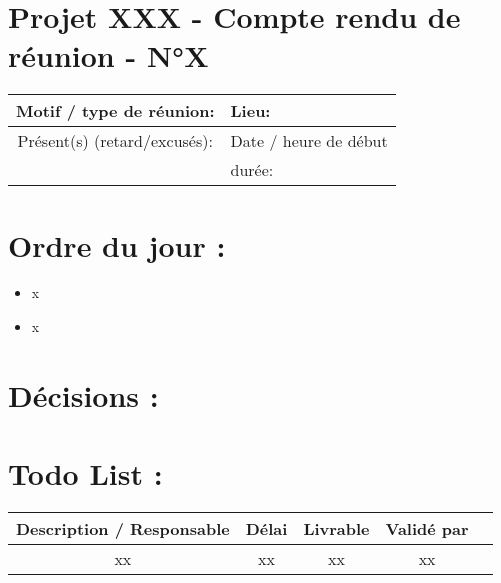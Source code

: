 \documentclass{article}
\begin{document}
\section*{Projet XXX - Compte rendu de réunion - N°X}

\begin{tabular}{|c|p{6cm}|}
    \hline
    Motif / type de réunion: & Lieu: \\
    \hline
    Présent(s) (retard/excusés): & Date / heure de début \\
    & durée: \\
    \hline
\end{tabular}


\section*{Ordre du jour :}
\begin{itemize}
    \item x
    \item x
\end{itemize}

\section*{Décisions :}

\section*{Todo List :}
\begin{tabular}{|c|c|c|c|c}
    \hline
    Description / Responsable & Délai & Livrable & Validé par \\
    \hline
    xx & xx & xx & xx\\
    \hline
\end{tabular}
\end{document}
